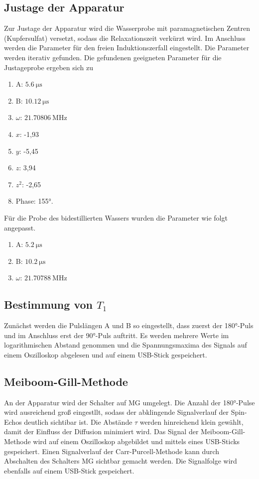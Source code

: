 \subsection{Justage der Apparatur}
Zur Justage der Apparatur wird die Wasserprobe mit paramagnetischen Zentren (Kupfersulfat)
versetzt, sodass die Relaxationszeit verkürzt wird. Im Anschluss werden die Parameter
für den freien Induktionszerfall eingestellt.
Die Parameter werden iterativ gefunden. Die gefundenen geeigneten Parameter für die
Justageprobe ergeben sich zu
\begin{enumerate}
  \item A: $\SI{5,6}{\micro\second}$
  \item B: $\SI{10,12}{\micro\second}$
  \item $\omega$: $\SI{21,70806}{\mega\hertz}$
  \item $x$: -1,93
  \item $y$: -5,45
  \item $z$: 3,94
  \item $z^2$: -2,65
  \item Phase: 155°.
\end{enumerate}
Für die Probe des bidestillierten Wassers wurden die Parameter wie folgt angepasst.
\begin{enumerate}
  \item A: $\SI{5,2}{\micro\second}$
  \item B: $\SI{10,2}{\micro\second}$
  \item $\omega$: $\SI{21,70788}{\mega\hertz}$
\end{enumerate}

\subsection{Bestimmung von $T_1$}

Zunächst werden die Pulslängen A und B so eingestellt, dass zuerst der 180°-Puls und im
Anschluss erst der 90°-Puls auftritt. Es werden mehrere Werte im logarithmischen Abstand
genommen und die Spannungsmaxima des Signals auf einem Oszilloskop abgelesen und
auf einem USB-Stick gespeichert.

\subsection{Meiboom-Gill-Methode}

An der Apparatur wird der Schalter auf MG umgelegt. Die Anzahl der 180°-Pulse
wird ausreichend groß eingestllt, sodass der abklingende Signalverlauf der Spin-Echos
deutlich sichtibar ist. Die Abstände $\tau$ werden hinreichend klein gewählt, damit
der Einfluss der Diffusion minimiert wird.
Das Signal der Meiboom-Gill-Methode wird auf einem Oszilloskop abgebildet und mittels
eines USB-Sticks gespeichert.
Einen Signalverlauf der Carr-Purcell-Methode kann durch Abschalten des Schalters MG
sichtbar gemacht werden. Die Signalfolge wird ebenfalls auf einem USB-Stick gespeichert.

